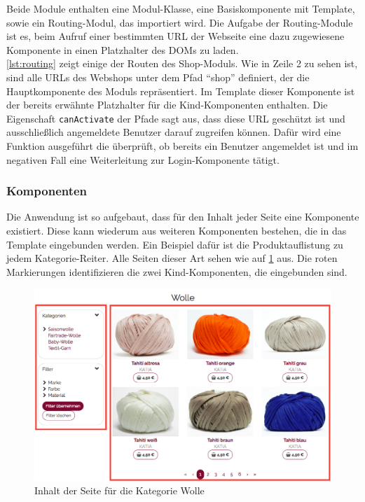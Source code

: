 Beide Module enthalten eine Modul-Klasse, eine Basiskomponente mit Template, sowie ein Routing-Modul, das importiert wird. Die Aufgabe der Routing-Module ist es, beim Aufruf einer bestimmten URL der Webseite eine dazu zugewiesene Komponente in einen Platzhalter des \acs{DOM}s zu laden.
\\


\cref{lst:routing} zeigt einige der Routen des Shop-Moduls. Wie in Zeile 2 zu sehen ist, sind alle URLs des Webshops unter dem Pfad \enquote{shop} definiert, der die Hauptkomponente des Moduls repräsentiert. Im Template dieser Komponente ist der bereits erwähnte Platzhalter für die Kind-Komponenten enthalten. Die Eigenschaft \texttt{canActivate} der Pfade sagt aus, dass diese URL geschützt ist und ausschließlich angemeldete Benutzer darauf zugreifen können. Dafür wird eine Funktion ausgeführt die überprüft, ob bereits ein Benutzer angemeldet ist und im negativen Fall eine Weiterleitung zur Login-Komponente tätigt.

\subsubsection{Komponenten}
Die Anwendung ist so aufgebaut, dass für den Inhalt jeder Seite eine Komponente existiert. Diese kann wiederum aus weiteren Komponenten bestehen, die in das Template eingebunden werden. Ein Beispiel dafür ist die Produktauflistung zu jedem Kategorie-Reiter. Alle Seiten dieser Art sehen wie auf \cref{fig:items_list} aus. Die roten Markierungen identifizieren die zwei Kind-Komponenten, die eingebunden sind.

\begin{figure}[th!]
	\centering
	\includegraphics[width=0.8\linewidth]{bilder/kap7/items}
	\caption{Inhalt der Seite für die Kategorie Wolle}
	\label{fig:items_list}
\end{figure}

